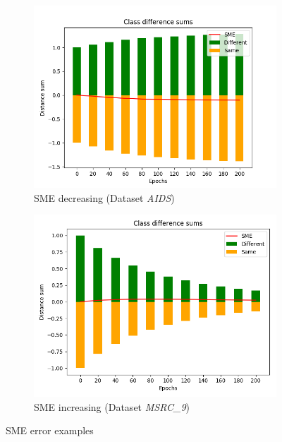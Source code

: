 		\begin{figure}[H]
			\centering	
			\begin{subfigure}{0.45\textwidth}
				\centering
				\includegraphics[width=1.\linewidth]{images/plotMethod_ClDiffSums_AIDS_E_GDL_18_23h-04m}
				\caption{SME decreasing {\footnotesize(Dataset \textit{AIDS})}}
				\label{fig:plotmethodcldiffsumsaidsegdl1823h-04mhe}
			\end{subfigure}
			\begin{subfigure}{0.45\textwidth}
				\centering
				\includegraphics[width=1.\linewidth]{images/plotMethod_ClDiffSums_MSRC_9_E_GDL_22_00h-05mExp3}
				\caption{SME increasing {\footnotesize(Dataset \textit{MSRC\_9})}}
				\label{fig:plotmethodcldiffsumsmsrc9egdl2200h-05mexp3}
			\end{subfigure}
			\caption{SME error examples}
			\label{fig:SMEExamples}
		\end{figure}
	
